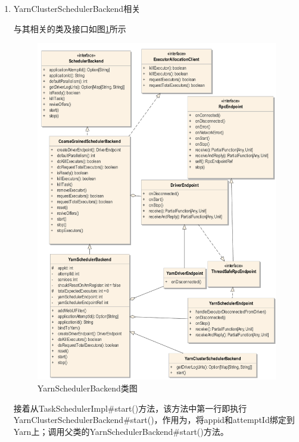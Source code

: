 \begin{enumerate}[\bfseries 1]
此方法最重要的作用就是将Scheduler和SchedulerBackend进行绑定，并制定Job的调度模式，当然默认情况下为FIFO。

接着执行\_taskScheduler.start()，由类图\ref{fig:YarnScheduler}可知实际上调用的是TaskSchedulerImpl\#start()方法，此方法代码如程序\ref{inputPrg:starttaskscheduler}所示，此方法首先调用YarnClusterSchedulerBackend\#start()，之后判断是否需要检查慢服务。
\begin{codeInput}{Scala}{开启任务调度器}{starttaskscheduler}
override def start() {
  //Yarn-cluster模式下为YarnClusterSchedulerBackend
  backend.start()	
    if (!isLocal && conf.getBoolean("spark.speculation", false)) {
      speculationScheduler.scheduleAtFixedRate(new Runnable {
        override def run(): Unit = Utils.tryOrStopSparkContext(sc) {
          checkSpeculatableTasks()
        }
      }, SPECULATION_INTERVAL_MS, SPECULATION_INTERVAL_MS, TimeUnit.MILLISECONDS)
    }
}
\end{codeInput}
	\item YarnClusterSchedulerBackend相关
	
	与其相关的类及接口如图\ref{fig:YarnSchedulerBackend}所示
	\begin{figure}[H] 
		\centering
		\includegraphics[width=\textwidth]{figures/YarnSchedulerBackend.pdf}
		\caption{YarnSchedulerBackend类图}
		\label{fig:YarnSchedulerBackend}
	\end{figure}
	接着从TaskSchedulerImpl\#start()方法，该方法中第一行即执行YarnClusterSchedulerBackend\#start()，作用为，将appid和attemptId绑定到Yarn上；调用父类的YarnSchedulerBackend\#start()方法。
	

\end{enumerate}

